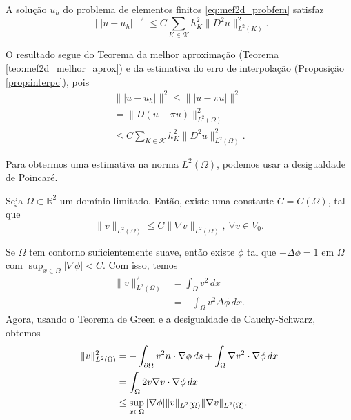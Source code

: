 \begin{teo}\label{teo:mef2d_est_apriori_energia}
  A solução $u_h$ do problema de elementos finitos \eqref{eq:mef2d_probfem} satisfaz
  \begin{equation}
    \||u-u_h|\|^2 \leq C\sum_{K\in\mathcal{K}} h_K^2\|D^2u\|_{L^2(K)}^2.
  \end{equation}
\end{teo}
\begin{dem}
  O resultado segue do Teorema da melhor aproximação (Teorema \ref{teo:mef2d_melhor_aprox}) e da estimativa do erro de interpolação (Proposição \ref{prop:interpc}), pois
  \begin{align}
    \||u-u_h|\|^2 \leq \||u-\pi u|\|^2\\
    = \|D(u-\pi u)\|_{L^2(\Omega)}^2\\
    \leq C\sum_{K\in\mathcal{K}} h_K^2\|D^2u\|_{L^2(\Omega)}^2.
  \end{align}
\end{dem}

Para obtermos uma estimativa na norma $L^2(\Omega)$, podemos usar a desigualdade de Poincaré.

\begin{teo}
  Seja $\Omega\subset \mathbb{R}^2$ um domínio limitado. Então, existe uma constante $C = C(\Omega)$, tal que
  \begin{equation}
    \|v\|_{L^2(\Omega)} \leq C\|\nabla v\|_{L^2(\Omega)},~\forall v\in V_0.
  \end{equation}
\end{teo}
\begin{dem}
  Se $\Omega$ tem contorno suficientemente suave, então existe $\phi$ tal que $-\Delta \phi = 1$ em $\Omega$ com $\sup_{x\in\Omega}|\nabla \phi| < C$. Com isso, temos
  \begin{align}
    \|v\|_{L^2(\Omega)}^2 &= \int_{\Omega} v^2\,dx\\
    &= -\int_{\Omega} v^2\Delta\phi\,dx.
  \end{align}
Agora, usando o Teorema de Green e a desigualdade de Cauchy-Schwarz, obtemos
\begin{align}
  \|v\|_{L^2(\Omega)}^2 &= -\int_{\partial\Omega} v^2n\cdot\nabla \phi\,ds + \int_\Omega \nabla v^2\cdot\nabla \phi\,dx\\
  &= \int_\Omega 2v\nabla v\cdot\nabla \phi\,dx\\
  &\leq \sup_{x\in\Omega} |\nabla \phi|\|v\|_{L^2(\Omega)}\|\nabla v\|_{L^2(\Omega)}.
\end{align}
\end{dem}

